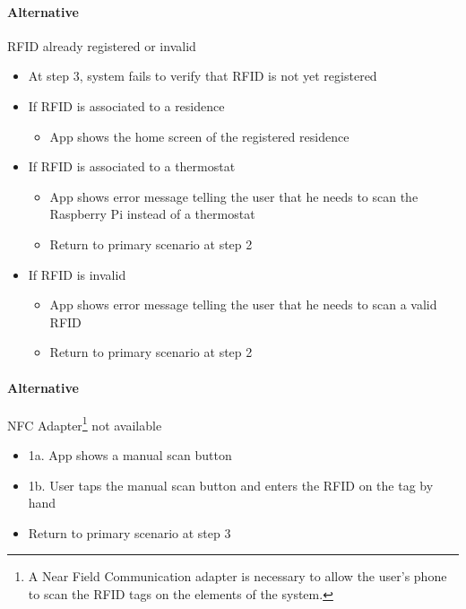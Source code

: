 \paragraph{Alternative} RFID already registered or invalid
\begin{itemize}
    \item At step 3, system fails to verify that RFID is not yet registered
    \item{If RFID is associated to a residence
        \begin{itemize}
        \item App shows the home screen of the registered residence
        \end{itemize}
        }
    \item {If RFID is associated to a thermostat
        \begin{itemize}
        \item App shows error message telling the user that he needs to scan the Raspberry Pi instead of a thermostat
        \item Return to primary scenario at step 2
        \end{itemize}
    }
    \item {If RFID is invalid
        \begin{itemize}
        \item App shows error message telling the user that he needs to scan a valid RFID
        \item Return to primary scenario at step 2
        \end{itemize}
    }
\end{itemize}
    
\paragraph{Alternative} NFC Adapter\footnote{A Near Field Communication adapter is necessary to allow the user's phone to scan the RFID tags on the elements of the system.} not available
\begin{itemize}
    \item 1a. App shows a manual scan button
    \item 1b. User taps the manual scan button and enters the RFID on the tag by hand
    \item Return to primary scenario at step 3
\end{itemize}

